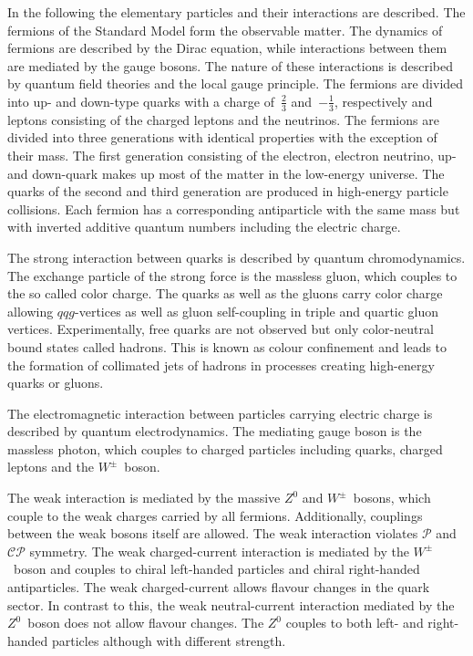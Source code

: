 In the following the elementary particles and their interactions are described.
The fermions of the Standard Model form the observable matter. The dynamics of
fermions are described by the Dirac equation, while interactions between them
are mediated by the gauge bosons. The nature of these interactions is described
by quantum field theories and the local gauge principle. The fermions are
divided into up- and down-type quarks with a charge of~$\frac{2}{3}$
and~$-\frac{1}{3}$, respectively and leptons consisting of the charged leptons
and the neutrinos. The fermions are divided into three generations with
identical properties with the exception of their mass. The first generation
consisting of the electron, electron neutrino, up- and down-quark makes up most
of the matter in the low-energy universe. The quarks of the second and third
generation are produced in high-energy particle collisions. Each fermion has a
corresponding antiparticle with the same mass but with inverted additive quantum
numbers including the electric charge.

The strong interaction between quarks is described by quantum chromodynamics.
The exchange particle of the strong force is the massless gluon, which couples
to the so called color charge. The quarks as well as the gluons carry color
charge allowing $qqg$-vertices as well as gluon self-coupling in triple and
quartic gluon vertices. Experimentally, free quarks are not observed but only
color-neutral bound states called hadrons. This is known as colour confinement
and leads to the formation of collimated jets of hadrons in processes creating
high-energy quarks or gluons.

The electromagnetic interaction between particles carrying electric charge is
described by quantum electrodynamics. The mediating gauge boson is the massless
photon, which couples to charged particles including quarks, charged leptons and
the $W^\pm$~boson.

The weak interaction is mediated by the massive $Z^0$ and $W^\pm$~bosons, which
couple to the weak charges carried by all fermions. Additionally, couplings
between the weak bosons itself are allowed. The weak interaction violates
$\mathcal{P}$ and $\mathcal{CP}$ symmetry. The weak charged-current interaction
is mediated by the $W^\pm$~boson and couples to chiral left-handed particles and
chiral right-handed antiparticles. The weak charged-current allows flavour
changes in the quark sector. In contrast to this, the weak neutral-current
interaction mediated by the $Z^0$~boson does not allow flavour changes. The
$Z^0$ couples to both left- and right-handed particles although with different
strength.

